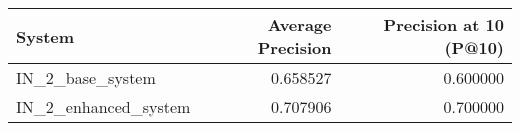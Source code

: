 \begin{tabular}{lrr}
\toprule
System & Average Precision & Precision at 10 (P@10) \\
\midrule
IN_2_base_system & 0.658527 & 0.600000 \\
IN_2_enhanced_system & 0.707906 & 0.700000 \\
\bottomrule
\end{tabular}
